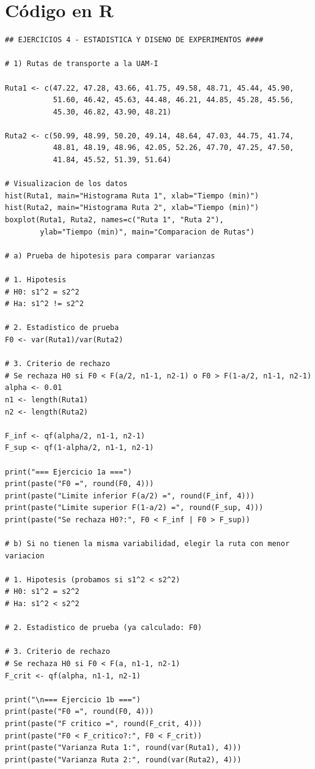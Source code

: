 \documentclass[12pt,a4paper]{article}
\begin{document}
\newpage
\section*{Código en R}

\begin{lstlisting}
## EJERCICIOS 4 - ESTADISTICA Y DISENO DE EXPERIMENTOS ####

# 1) Rutas de transporte a la UAM-I

Ruta1 <- c(47.22, 47.28, 43.66, 41.75, 49.58, 48.71, 45.44, 45.90, 
           51.60, 46.42, 45.63, 44.48, 46.21, 44.85, 45.28, 45.56, 
           45.30, 46.82, 43.90, 48.21)

Ruta2 <- c(50.99, 48.99, 50.20, 49.14, 48.64, 47.03, 44.75, 41.74, 
           48.81, 48.19, 48.96, 42.05, 52.26, 47.70, 47.25, 47.50, 
           41.84, 45.52, 51.39, 51.64)

# Visualizacion de los datos
hist(Ruta1, main="Histograma Ruta 1", xlab="Tiempo (min)")
hist(Ruta2, main="Histograma Ruta 2", xlab="Tiempo (min)")
boxplot(Ruta1, Ruta2, names=c("Ruta 1", "Ruta 2"), 
        ylab="Tiempo (min)", main="Comparacion de Rutas")

# a) Prueba de hipotesis para comparar varianzas

# 1. Hipotesis
# H0: s1^2 = s2^2
# Ha: s1^2 != s2^2

# 2. Estadistico de prueba
F0 <- var(Ruta1)/var(Ruta2)

# 3. Criterio de rechazo
# Se rechaza H0 si F0 < F(a/2, n1-1, n2-1) o F0 > F(1-a/2, n1-1, n2-1)
alpha <- 0.01
n1 <- length(Ruta1)
n2 <- length(Ruta2)

F_inf <- qf(alpha/2, n1-1, n2-1)
F_sup <- qf(1-alpha/2, n1-1, n2-1)

print("=== Ejercicio 1a ===")
print(paste("F0 =", round(F0, 4)))
print(paste("Limite inferior F(a/2) =", round(F_inf, 4)))
print(paste("Limite superior F(1-a/2) =", round(F_sup, 4)))
print(paste("Se rechaza H0?:", F0 < F_inf | F0 > F_sup))

# b) Si no tienen la misma variabilidad, elegir la ruta con menor variacion

# 1. Hipotesis (probamos si s1^2 < s2^2)
# H0: s1^2 = s2^2
# Ha: s1^2 < s2^2

# 2. Estadistico de prueba (ya calculado: F0)

# 3. Criterio de rechazo
# Se rechaza H0 si F0 < F(a, n1-1, n2-1)
F_crit <- qf(alpha, n1-1, n2-1)

print("\n=== Ejercicio 1b ===")
print(paste("F0 =", round(F0, 4)))
print(paste("F critico =", round(F_crit, 4)))
print(paste("F0 < F_critico?:", F0 < F_crit))
print(paste("Varianza Ruta 1:", round(var(Ruta1), 4)))
print(paste("Varianza Ruta 2:", round(var(Ruta2), 4)))



\end{lstlisting}
\end{document}

